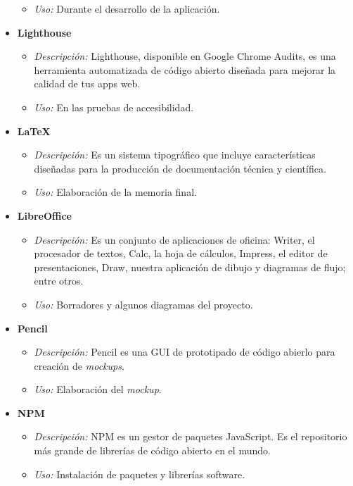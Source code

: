 \begin{itemize}
\begin{itemize}
\item \textit{Uso: }Durante el desarrollo de la aplicación.
\end{itemize}
\item \textbf{Lighthouse}
\begin{itemize}
\item \textit{Descripción: }Lighthouse, disponible en Google Chrome Audits, es una herramienta automatizada de código abierto diseñada para mejorar la calidad de tus apps web\cite{google_audits}.
\item \textit{Uso: }En las pruebas de accesibilidad.
\end{itemize}
\item \textbf{\LaTeX}
\begin{itemize}
\item \textit{Descripción: }Es un sistema tipográfico que incluye características diseñadas para la producción de documentación técnica y científica\cite{latex}.
\item \textit{Uso: }Elaboración de la memoria final.
\end{itemize}
\item \textbf{LibreOffice}
\begin{itemize}
\item \textit{Descripción: }Es un conjunto de aplicaciones de oficina: Writer, el procesador de textos, Calc, la hoja de cálculos, Impress, el editor de presentaciones, Draw, nuestra aplicación de dibujo y diagramas de flujo; entre otros\cite{libreoffice}. 
\item \textit{Uso: }Borradores y algunos diagramas del proyecto.
\end{itemize}
\item \textbf{Pencil}
\begin{itemize}
\item \textit{Descripción: }Pencil es una GUI de prototipado de código abierlo para creación de \textit{mockups}\cite{pencil}.
\item \textit{Uso: }Elaboración del \textit{mockup}.
\end{itemize}
\item \textbf{NPM}
\begin{itemize}
\item \textit{Descripción: }NPM es un gestor de paquetes JavaScript. Es el repositorio más grande de librerías de código abierto en el mundo\cite{npm}. 
\item \textit{Uso: }Instalación de paquetes y librerías software.
\end{itemize}

\end{itemize}
